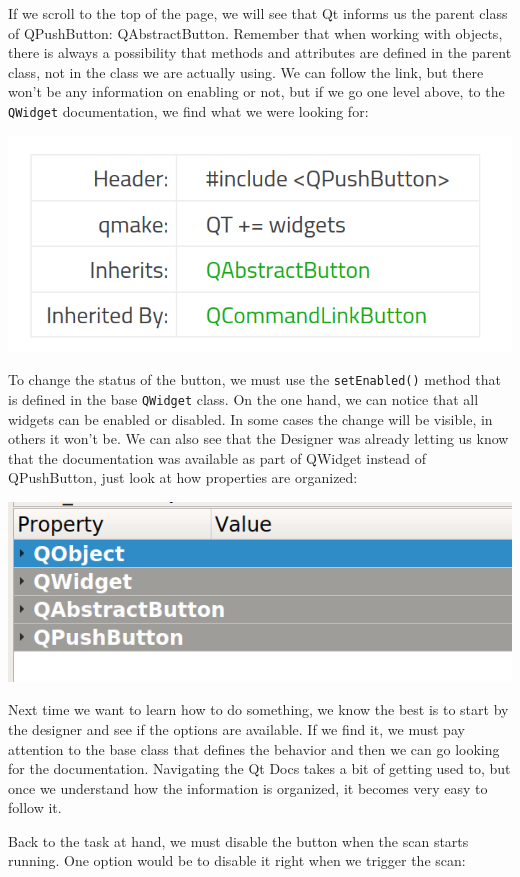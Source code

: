 If we scroll to the top of the page, we will see that Qt informs us the parent class of QPushButton: QAbstractButton. Remember that when working with objects, there is always a possibility that methods and attributes are defined in the parent class, not in the class we are actually using. We can follow the link, but there won't be any information on enabling or not, but if we go one level above, to the \texttt{QWidget} documentation, we find what we were looking for:

\begin{center}
    \includegraphics[width=.4\linewidth]{images/Chapter_09/11_Qt_Docs_inheritance.png}
\end{center}

To change the status of the button, we must use the \texttt{setEnabled()} method that is defined in the base \texttt{QWidget} class. On the one hand, we can notice that all widgets can be enabled or disabled. In some cases the change will be visible, in others it won't be. We can also see that the Designer was already letting us know that the documentation was available as part of QWidget instead of QPushButton, just look at how properties are organized:

\begin{center}
    \includegraphics[width=.4\linewidth]{images/Chapter_09/12_Designer_object_inheritance.png}
\end{center}

Next time we want to learn how to do something, we know the best is to start by the designer and see if the options are available. If we find it, we must pay attention to the base class that defines the behavior and then we can go looking for the documentation. Navigating the Qt Docs takes a bit of getting used to, but once we understand how the information is organized, it becomes very easy to follow it.

Back to the task at hand, we must disable the button when the scan starts running. One option would be to disable it right when we trigger the scan:

